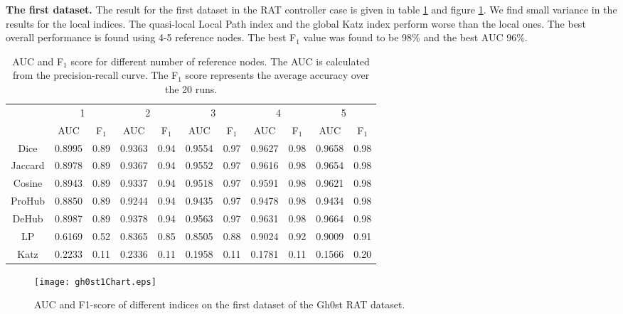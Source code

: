 \textbf{The first dataset.} The result for the first dataset in the RAT controller case is given in table \ref{aucIndex} and figure \ref{gh0stChart1}. We find small variance in the results for the local indices. The quasi-local Local Path index and the global Katz index perform worse than the local ones. The best overall performance is found using 4-5 reference nodes. The best F$_1$ value was found to be 98\% and the best AUC 96\%. 

\begin{table}[h!]
    \centering
    \caption{AUC and F$_1$ score for different number of reference nodes. The AUC is calculated from the precision-recall curve. The F$_1$ score represents the average accuracy over the 20 runs.}
    \begin{tabular}{|c||c|c||c|c||c|c||c|c||c|c|}
      \hline
      \multirow{2}{*}{~} 
            & \multicolumn{2}{c||}{1}
            & \multicolumn{2}{c||}{2}
            & \multicolumn{2}{c||}{3}
            & \multicolumn{2}{c||}{4}
            & \multicolumn{2}{|c|}{5} \\             \cline{2-11}
      ~     &AUC&F$_1$&AUC&F$_1$&AUC&F$_1$&AUC&F$_1$&AUC&F$_1$ \\ \hline
    Dice    &0.8995 & 0.89 & 0.9363 &0.94 &0.9554&0.97 & 0.9627 &0.98&0.9658 & 0.98 \\
    Jaccard &0.8978 & 0.89 & 0.9367 &0.94 &0.9552&0.97 & 0.9616 &0.98&0.9654 & 0.98 \\
    Cosine  &0.8943 & 0.89 & 0.9337 &0.94 &0.9518&0.97 & 0.9591 &0.98&0.9621 & 0.98 \\
    ProHub  &0.8850 & 0.89 & 0.9244 &0.94 &0.9435&0.97 & 0.9478 &0.98&0.9434 & 0.98 \\
    DeHub   &0.8987 & 0.89 & 0.9378 &0.94 &0.9563&0.97 & 0.9631 &0.98&0.9664 & 0.98 \\
    LP      &0.6169 & 0.52 & 0.8365 & 0.85 & 0.8505 & 0.88 & 0.9024 & 0.92 & 0.9009 & 0.91 \\ 
    Katz    &0.2233 & 0.11 & 0.2336 & 0.11 & 0.1958 & 0.11 & 0.1781 & 0.11 & 0.1566 & 0.20 \\ \hline
    \end{tabular}
    \label{aucIndex}
\end{table}

\begin{figure}[h!]
    \centering
    \texttt{[image: gh0st1Chart.eps]}
    \caption{AUC and F1-score of different indices on the first dataset of the Gh0st RAT dataset.}
    \label{gh0stChart1}
\end{figure}


